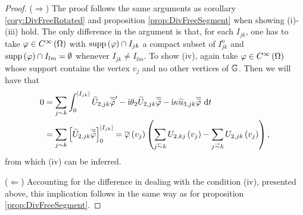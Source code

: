 \begin{proof}
	($\Rightarrow$) The proof follows the same arguments as corollary \ref{cory:DivFreeRotated} and proposition \ref{prop:DivFreeSegment} when showing (i)-(iii) hold.
	The only difference in the argument is that, for each $I_{jk}$, one has to take $\varphi\in C^{\infty}\left( \Omega \right)$ with $\mathrm{supp}\left( \varphi \right)\cap I_{jk}$ a compact subset of $I_{jk}^{\mathrm{o}}$ and $\mathrm{supp}\left( \varphi \right)\cap I_{lm} = \emptyset$ whenever $I_{jk}\neq I_{lm}$.
	To show (iv), again take $\varphi\in C^{\infty}\left( \Omega \right)$ whose support contains the vertex $v_j$ and no other vertices of $\mathbb{G}$.
	Then we will have that
	\begin{align*}
		0
		&= \sum_{j\con k}\int_0^{\abs{I_{jk}}} \widetilde{U}_{2,jk}\overline{\widetilde{\varphi}}' - \rmi\qm_2\widetilde{U}_{2,jk}\overline{\widetilde{\varphi}} - \rmi\wavenumber\widetilde{u}_{3,jk}\overline{\widetilde{\varphi}} \ \md t  \\
		&= \sum_{j\con k}\sqbracs{ \widetilde{U}_{2,jk}\overline{\widetilde{\varphi}} }_0^{\abs{I_{jk}}}
		= \overline{\varphi}\bracs{v_j}\bracs{ \sum_{j\conRight k} U_{2,kj}\bracs{v_j} - \sum_{j\conLeft k} U_{2,jk}\bracs{v_j} },
	\end{align*}
	from which (iv) can be inferred.
	
	($\Leftarrow$) Accounting for the difference in dealing with the condition (iv), presented above, this implication follows in the same way as for proposition \ref{prop:DivFreeSegment}.
\end{proof}